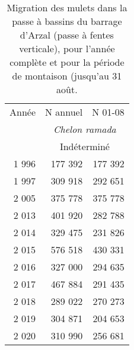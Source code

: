\begin{table}[ht]
\centering
\begin{tabular}{rrr}
  \toprule
Année & N annuel & N 01-08 \\ 
  &\multicolumn{2}{c}{\textit{Chelon ramada}}  \\
						&\multicolumn{2}{c}{Indéterminé} \\
						 \midrule
1 996 & 177 392 & 177 392 \\ 
  1 997 & 309 918 & 292 651 \\ 
  2 005 & 375 778 & 375 778 \\ 
  2 013 & 401 920 & 282 788 \\ 
  2 014 & 329 475 & 231 826 \\ 
  2 015 & 576 518 & 430 331 \\ 
  2 016 & 327 000 & 294 635 \\ 
  2 017 & 467 884 & 291 435 \\ 
  2 018 & 289 022 & 270 273 \\ 
  2 019 & 304 871 & 204 653 \\ 
  2 020 & 310 990 & 256 681 \\ 
   \bottomrule
\end{tabular}
\caption{Migration des mulets dans la passe à bassins du barrage d'Arzal 
				(passe à fentes verticale), pour l'année complète et pour la période de montaison 
				(jusqu'au 31 août.} 
\label{table_bilanannuel_mulets_0108}
\end{table}
